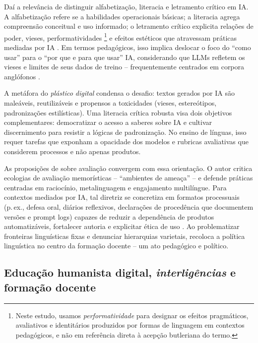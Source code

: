 \documentclass[portuguese]{textolivre}
\begin{document}
Daí a relevância de distinguir alfabetização, literacia e letramento crítico em IA. A alfabetização refere se a habilidades operacionais básicas; a literacia agrega compreensão conceitual e uso informado; o letramento crítico explicita relações de poder, vieses, performatividades \footnote{Neste estudo, usamos \emph{performatividade} para designar os efeitos pragmáticos, avaliativos e identitários produzidos por formas de linguagem em contextos pedagógicos, e não em referência direta à acepção butleriana do termo.}  e efeitos estéticos que atravessam práticas mediadas por IA \cite{LongMagerko2020, FarazouliEtAl2024, SperlingEtAl2024, McGrathEtAl2024, RoeEtAl2025}. Em termos pedagógicos, isso implica deslocar o foco do “como usar” para o “por que e para que usar” IA, considerando que LLMs refletem os vieses e limites de seus dados de treino – frequentemente centrados em corpora anglófonos \cite{Pimienta2026}.

A metáfora do \textit{plástico digital} \cite{RoeEtAl2025} condensa o desafio: textos gerados por IA são maleáveis, reutilizáveis e propensos a toxicidades (vieses, estereótipos, padronizações estilísticas). Uma literacia crítica robusta visa dois objetivos complementares: democratizar o acesso a saberes sobre IA e cultivar discernimento para resistir a lógicas de padronização. No ensino de línguas, isso requer tarefas que exponham a opacidade dos modelos e rubricas avaliativas que considerem processos e não apenas produtos.

As proposições de \textcite{Agnihotri2025} sobre avaliação convergem com essa orientação. O autor critica ecologias de avaliação memorísticas – “ambientes de ameaça” – e defende práticas centradas em raciocínio, metalinguagem e engajamento multilíngue. Para contextos mediados por IA, tal diretriz se concretiza em formatos processuais (p. ex., defesa oral, diários reflexivos, declarações de procedência que documentem versões e prompt logs) capazes de reduzir a dependência de produtos automatizáveis, fortalecer autoria e explicitar ética de uso \cite{AmaroPires2024}. Ao problematizar fronteiras linguísticas fixas e denunciar hierarquias varietais, \textcite{Agnihotri2025} recoloca a política linguística no centro da formação docente – um ato pedagógico e político.


\subsection{Educação humanista digital, \emph{interligências} e formação docente}\label{sec-edu}
\end{document}
